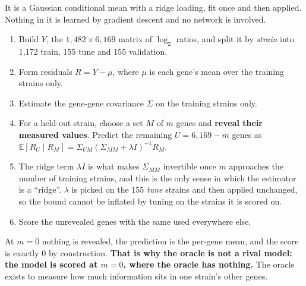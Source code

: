  It is a Gaussian
conditional mean with a ridge loading, fit once and then applied. Nothing in it is learned
by gradient descent and no network is involved.

\begin{enumerate}
\item Build $Y$, the $1{,}482 \times 6{,}169$ matrix of $\log_2$ ratios, and split it by
  \emph{strain} into 1,172 train, 155 tune and 155 validation.
\item Form residuals $R = Y - \mu$, where $\mu$ is each gene's mean over the training
  strains only.
\item Estimate the gene-gene covariance $\Sigma$ on the training strains only.
\item For a held-out strain, choose a set $M$ of $m$ genes and \textbf{reveal their measured
  values}. Predict the remaining $U = 6{,}169 - m$ genes as
  $\mathbb{E}[R_U \mid R_M] = \Sigma_{UM}(\Sigma_{MM} + \lambda I)^{-1} R_M$.
\item The ridge term $\lambda I$ is what makes $\Sigma_{MM}$ invertible once $m$ approaches
  the number of training strains, and this is the only sense in which the estimator is a
  ``ridge''. $\lambda$ is picked on the 155 \emph{tune} strains and then applied unchanged,
  so the bound cannot be inflated by tuning on the strains it is scored on.
\item Score the unrevealed genes with the same  used everywhere
  else.
\end{enumerate}

At $m = 0$ nothing is revealed, the prediction is the per-gene mean, and the score is
exactly $0$ by construction. \textbf{That is why the oracle is not a rival model: the model
is scored at $m = 0$, where the oracle has nothing.} The oracle exists to measure how much
information sits in one strain's other genes.

